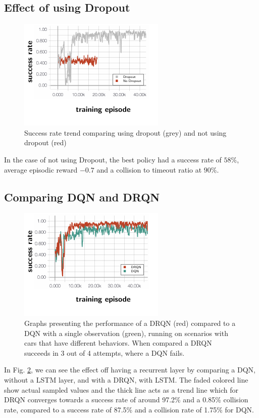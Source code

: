 \subsection{Effect of using Dropout}
\begin{figure}[!h]
	\centering
	\includegraphics[width=0.7\columnwidth]{figures/figures-dropout.pdf}
	\vspace{-0.5cm}
	\caption{Success rate trend comparing using dropout (grey) and not using dropout (red)}
	\label{fig:results_dropout}
\end{figure}
In the case of not using Dropout, the best policy had a success rate of $58\%$, average episodic reward $-0.7$ and a collision to timeout ratio at $90 \%$. 


\subsection{Comparing DQN and DRQN}
\begin{figure}[!h]
	\centering
	\includegraphics[width=0.7\columnwidth]{figures/figures-recurrent.pdf}
	\vspace{-0.5cm}
	\caption{Graphs presenting the performance of a DRQN (red) compared to a DQN with a single observation (green), running on scenarios with cars that have different behaviors. When compared a DRQN succeeds in 3 out of 4 attempts, where a DQN fails.}
	\label{fig:results_recurremt}
\end{figure}
In Fig. \ref{fig:results_recurremt}, we can see the effect off having a recurrent layer by comparing a DQN, without a LSTM layer, and  with a DRQN, with LSTM.
The faded colored line show actual sampled values and the thick line acts as a trend line which for DRQN converges towards a success rate of around 97.2\% and a 0.85\% collision rate, compared to a success rate of 87.5\% and a collision rate of 1.75\% for DQN. 


